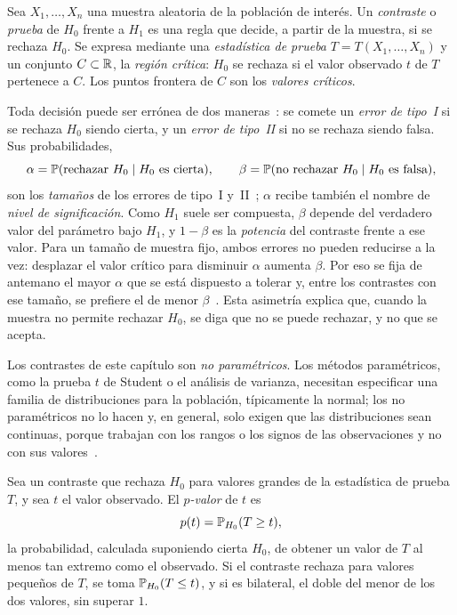 \begin{definicion}\label{def:contraste}
Sea $X_1, \dots, X_n$ una muestra aleatoria de la población de interés. Un \emph{contraste} o \emph{prueba} de $H_0$ frente a $H_1$ es una regla que decide, a partir de la muestra, si se rechaza $H_0$. Se expresa mediante una \emph{estadística de prueba} $T = T(X_1, \dots, X_n)$ y un conjunto $C \subset \mathbb{R}$, la \emph{región crítica}: $H_0$ se rechaza si el valor observado $t$ de $T$ pertenece a $C$. Los puntos frontera de $C$ son los \emph{valores críticos}.
\end{definicion}

Toda decisión puede ser errónea de dos maneras~\cite[sec.~9.2]{canavos2003}: se comete un \emph{error de tipo~I} si se rechaza $H_0$ siendo cierta, y un \emph{error de tipo~II} si no se rechaza siendo falsa. Sus probabilidades,
\[
  \alpha = \mathbb{P}(\text{rechazar } H_0 \mid H_0 \text{ es cierta}), \qquad
  \beta = \mathbb{P}(\text{no rechazar } H_0 \mid H_0 \text{ es falsa}),
\]
son los \emph{tamaños} de los errores de tipo~I y~II~\cite[defs.~9.1 y~9.2]{canavos2003}; $\alpha$ recibe también el nombre de \emph{nivel de significación}. Como $H_1$ suele ser compuesta, $\beta$ depende del verdadero valor del parámetro bajo $H_1$, y $1 - \beta$ es la \emph{potencia} del contraste frente a ese valor. Para un tamaño de muestra fijo, ambos errores no pueden reducirse a la vez: desplazar el valor crítico para disminuir $\alpha$ aumenta $\beta$. Por eso se fija de antemano el mayor $\alpha$ que se está dispuesto a tolerar y, entre los contrastes con ese tamaño, se prefiere el de menor $\beta$~\cite[sec.~9.2]{canavos2003}. Esta asimetría explica que, cuando la muestra no permite rechazar $H_0$, se diga que no se puede rechazar, y no que se acepta.

Los contrastes de este capítulo son \emph{no paramétricos}. Los métodos paramétricos, como la prueba $t$ de Student o el análisis de varianza, necesitan especificar una familia de distribuciones para la población, típicamente la normal; los no paramétricos no lo hacen y, en general, solo exigen que las distribuciones sean continuas, porque trabajan con los rangos o los signos de las observaciones y no con sus valores~\cite[sec.~15.1]{canavos2003}.

\begin{definicion}[$p$-valor]\label{def:p-valor}
Sea un contraste que rechaza $H_0$ para valores grandes de la estadística de prueba $T$, y sea $t$ el valor observado. El \emph{$p$-valor} de $t$ es
\[
  p(t) = \mathbb{P}_{H_0}(T \ge t),
\]
la probabilidad, calculada suponiendo cierta $H_0$, de obtener un valor de $T$ al menos tan extremo como el observado. Si el contraste rechaza para valores pequeños de $T$, se toma $\mathbb{P}_{H_0}(T \le t)$, y si es bilateral, el doble del menor de los dos valores, sin superar $1$.
\end{definicion}

